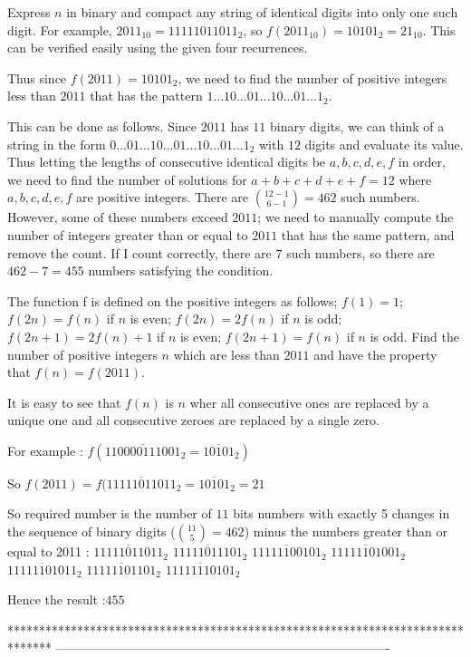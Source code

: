 \begin{solution}
	Express $n$ in binary and compact any string of identical digits into only one such digit. For example, $2011_{10} = 11111011011_2$, so $f(2011_{10}) = 10101_2 = 21_{10}$. This can be verified easily using the given four recurrences.

Thus since $f(2011) = 10101_2$, we need to find the number of positive integers less than $2011$ that has the pattern $1\ldots 10\ldots 01\ldots 10\ldots 01\ldots 1_2$.

This can be done as follows. Since $2011$ has $11$ binary digits, we can think of a string in the form $0\ldots 01\ldots 10\ldots 01\ldots 10\ldots 01\ldots 1_2$ with $12$ digits and evaluate its value. Thus letting the lengths of consecutive identical digits be $a,b,c,d,e,f$ in order, we need to find the number of solutions for $a+b+c+d+e+f = 12$ where $a,b,c,d,e,f$ are positive integers. There are $\binom{12-1}{6-1} = 462$ such numbers. However, some of these numbers exceed $2011$; we need to manually compute the number of integers greater than or equal to $2011$ that has the same pattern, and remove the count. If I count correctly, there are $7$ such numbers, so there are $462 - 7 = \boxed{455}$ numbers satisfying the condition.
\end{solution}



\begin{solution}
	\begin{tcolorbox}The function f is defined on the positive integers as follows;
$f(1) = 1$;
$f(2n) = f(n)$ if $n$ is even;
$f(2n) = 2f(n)$ if $n$ is odd;
$f(2n + 1) = 2f(n) + 1$ if $n$ is even;
$f(2n + 1) = f(n)$ if $n $ is odd.
Find the number of positive integers $n$ which are less than $2011$ and
have the property that $f(n) = f(2011)$.\end{tcolorbox}
It is easy to see that $f(n)$ is $n$ wher all consecutive ones are replaced by a unique one and all consecutive zeroes are replaced by a single zero.

For example : $f(\overline{110000111001}_2=\overline{10101}_2)$ 

So $f(2011)=f(\overline{11111011011}_2=\overline{10101}_2=21$

So required number is the number of $11$ bits numbers with exactly 5 changes in the sequence of binary digits ($\binom{11}5=462$) minus the numbers greater than or equal to 2011 :
$\overline{11111011011}_2$
$\overline{11111011101}_2$
$\overline{11111100101}_2$
$\overline{11111101001}_2$
$\overline{11111101011}_2$
$\overline{11111101101}_2$
$\overline{11111110101}_2$

Hence the result :$\boxed{455}$
\end{solution}
*******************************************************************************
-------------------------------------------------------------------------------

